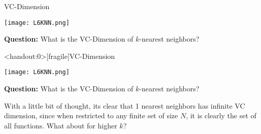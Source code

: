 \documentclass[10pt, table, dvipsnames, handout]{beamer}
\begin{document}
\begin{frame}[fragile]{VC-Dimension}
  \begin{minipage}[t][0.5\textheight][t]{\textwidth}
	\centering \texttt{[image: L6KNN.png]} 
  \end{minipage}
  \vfill
  \begin{minipage}[t][0.5\textheight][t]{\textwidth}
\textbf{Question:} What is the VC-Dimension of $k$-nearest neighbors?

\end{minipage}
\end{frame}





\begin{frame}<handout:0>[fragile]{VC-Dimension}
  \begin{minipage}[t][0.5\textheight][t]{\textwidth}
	\centering \texttt{[image: L6KNN.png]} 
  \end{minipage}
  \vfill
  \begin{minipage}[t][0.5\textheight][t]{\textwidth}
\textbf{Question:} What is the VC-Dimension of $k$-nearest neighbors? 

With a little bit of thought, its clear that 1 nearest neighbors has infinite VC dimension, since when restricted to any finite set of size $N$, it is clearly the set of all functions. What about for higher $k$?

\end{minipage}
\end{frame}
\end{document}

